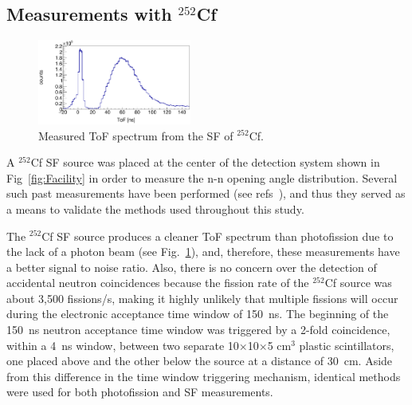 \documentclass[%
 reprint,
 amsmath,amssymb,
 aps,
 nofootinbib
]{revtex4-1}
\begin{document}
\subsection{Measurements with $^{252}$Cf}
\begin{figure}[h]
\includegraphics[width=0.45\textwidth]{Cf252ToF.png}
\caption{Measured ToF spectrum from the SF of $^{252}$Cf.}
\label{fig:Cf252ToF}
\end{figure}
A $^{252}$Cf SF source was placed at the center of the detection system shown in Fig~\ref{fig:Facility} in order to measure the n-n opening angle distribution.
Several such past measurements have been performed (see refs~\cite{1975Cf252, Pozzi2014, 2008CF252, Verbeke2018}), and thus they served as a means to validate the methods used throughout this study.

The $^{252}$Cf SF source produces a cleaner ToF spectrum than photofission due to the lack of a photon beam (see Fig.~\ref{fig:Cf252ToF}), and, therefore, these measurements have a better signal to noise ratio.
Also, there is no concern over the detection of accidental neutron coincidences because the fission rate of the $^{252}$Cf source was about 3,500 fissions/s, making it highly unlikely that multiple fissions will occur during the electronic acceptance time window of 150~ns.
The beginning of the 150~ns neutron acceptance time window was triggered by a 2-fold coincidence, within a 4~ns window, between two separate 10$\times$10$\times$5 cm$^3$ plastic scintillators, one placed above and the other below the source at a distance of 30~cm.
Aside from this difference in the time window triggering mechanism, identical methods were used for both photofission and SF measurements.
\FloatBarrier
\end{document}
